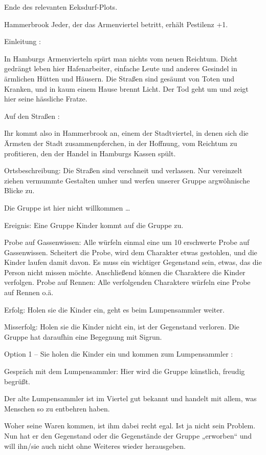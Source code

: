 Ende des relevanten Eeksdurf-Plots.

Hammerbrook
Jeder, der das Armenviertel betritt, erhält Pestilenz +1.

Einleitung
:

In Hamburgs Armenvierteln spürt man nichts vom neuen Reichtum. Dicht gedrängt leben hier Hafenarbeiter, einfache Leute und anderes Gesindel in ärmlichen Hütten und Häusern. Die Straßen sind gesäumt von Toten und Kranken, und in kaum einem Hause brennt Licht. Der Tod geht um und zeigt hier seine hässliche Fratze.

Auf den Straßen
:

Ihr kommt also in Hammerbrook an, einem der Stadtviertel, in denen sich die Ärmsten der Stadt zusammenpferchen, in der Hoffnung, vom Reichtum zu profitieren, den der Handel in Hamburgs Kassen spült.

Ortsbeschreibung: Die Straßen sind verschneit und verlassen. Nur vereinzelt ziehen vermummte Gestalten umher und werfen unserer Gruppe argwöhnische Blicke zu.

Die Gruppe ist hier nicht willkommen …

Ereignis: Eine Gruppe Kinder kommt auf die Gruppe zu.

Probe auf Gassenwissen:
Alle würfeln einmal eine um 10 erschwerte Probe auf Gassenwissen.
Scheitert die Probe, wird dem Charakter etwas gestohlen, und die Kinder laufen damit davon. Es muss ein wichtiger Gegenstand sein, etwas, das die Person nicht missen möchte.
Anschließend können die Charaktere die Kinder verfolgen.
Probe auf Rennen:
Alle verfolgenden Charaktere würfeln eine Probe auf Rennen o.ä.

Erfolg: Holen sie die Kinder ein, geht es beim Lumpensammler weiter.

Misserfolg: Holen sie die Kinder nicht ein, ist der Gegenstand verloren.
Die Gruppe hat daraufhin eine Begegnung mit Sigrun.

Option 1 – Sie holen die Kinder ein und kommen zum Lumpensammler
:

Gespräch mit dem Lumpensammler: Hier wird die Gruppe künstlich, freudig begrüßt.

Der alte Lumpensammler ist im Viertel gut bekannt und handelt mit allem, was Menschen so zu entbehren haben.

Woher seine Waren kommen, ist ihm dabei recht egal. Ist ja nicht sein Problem. Nun hat er den Gegenstand oder die Gegenstände der Gruppe „erworben“ und will ihn/sie auch nicht ohne Weiteres wieder herausgeben.

